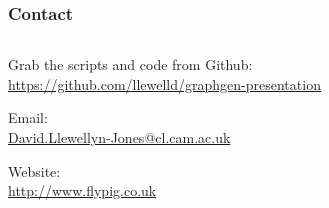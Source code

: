\documentclass[handout, notes=hide]{beamer}
\begin{document}

\begin{frame}[fragile]
\frametitle{Contact}

\begin{columns}[T]
\begin{column}[T]{1.0\textwidth}
\setlength{\parskip}{1.0em}

Grab the scripts and code from Github: \\
\qquad \url{https://github.com/llewelld/graphgen-presentation}

Email: \\
\qquad \href{mailto:David.Llewellyn-Jones@cl.cam.ac.uk}{David.Llewellyn-Jones@cl.cam.ac.uk}

Website: \\
\qquad \url{http://www.flypig.co.uk}

\end{column}
\end{columns}


\end{frame}
\note{
\setlength{\parskip}{0.5em}
}

\end{document}
